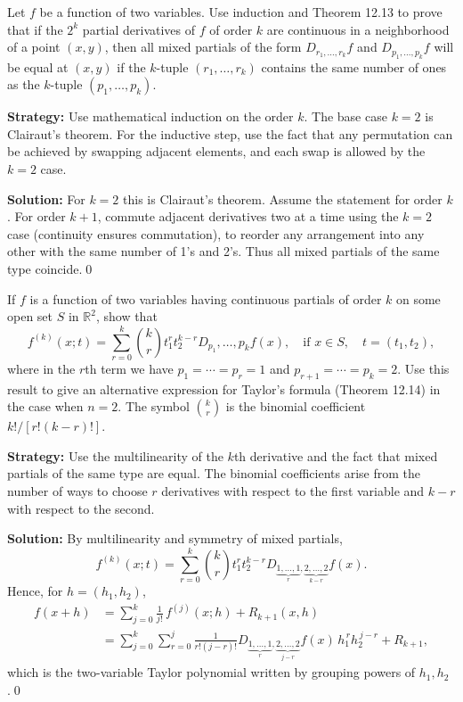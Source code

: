 \begin{problembox}
Let \( f \) be a function of two variables. Use induction and Theorem 12.13 to prove that if the \( 2^k \) partial derivatives of \( f \) of order \( k \) are continuous in a neighborhood of a point \( (x, y) \), then all mixed partials of the form \( D_{r_1, \ldots, r_k} f \) and \( D_{p_1, \ldots, p_k} f \) will be equal at \( (x, y) \) if the \( k \)-tuple \( (r_1, \ldots, r_k) \) contains the same number of ones as the \( k \)-tuple \( (p_1, \ldots, p_k) \).
\end{problembox}

\noindent\textbf{Strategy:} Use mathematical induction on the order \( k \). The base case \( k = 2 \) is Clairaut's theorem. For the inductive step, use the fact that any permutation can be achieved by swapping adjacent elements, and each swap is allowed by the \( k = 2 \) case.

\bigskip\noindent\textbf{Solution:}
For $k=2$ this is Clairaut's theorem. Assume the statement for order $k$. For order $k+1$, commute adjacent derivatives two at a time using the $k=2$ case (continuity ensures commutation), to reorder any arrangement into any other with the same number of 1's and 2's. Thus all mixed partials of the same type coincide.\qed


\begin{problembox}
If \( f \) is a function of two variables having continuous partials of order \( k \) on some open set \( S \) in \( \mathbb{R}^2 \), show that
\[f^{(k)} (x; t) = \sum_{r=0}^{k} \binom{k}{r} t_1^r t_2^{k-r} D_{p_1}, \ldots, p_k f(x), \quad \text{if } x \in S, \quad t = (t_1, t_2),\]
where in the \( r \)th term we have \( p_1 = \cdots = p_r = 1 \) and \( p_{r+1} = \cdots = p_k = 2 \). Use this result to give an alternative expression for Taylor's formula (Theorem 12.14) in the case when \( n = 2 \). The symbol \( \binom{k}{r} \) is the binomial coefficient \( k! / [r! (k - r)!] \).
\end{problembox}

\noindent\textbf{Strategy:} Use the multilinearity of the \( k \)th derivative and the fact that mixed partials of the same type are equal. The binomial coefficients arise from the number of ways to choose \( r \) derivatives with respect to the first variable and \( k-r \) with respect to the second.

\bigskip\noindent\textbf{Solution:}
By multilinearity and symmetry of mixed partials,
\[f^{(k)}(x;t)=\sum_{r=0}^k \binom{k}{r} t_1^r t_2^{k-r} D_{\underbrace{1,\dots,1}_{r},\underbrace{2,\dots,2}_{k-r}} f(x).\]
Hence, for $h=(h_1,h_2)$,
\begin{align*}
f(x+h)&=\sum_{j=0}^k \frac{1}{j!}\,f^{(j)}(x;h)+R_{k+1}(x,h)\\
&=\sum_{j=0}^k\sum_{r=0}^j \frac{1}{r!(j-r)!} D_{\!\underbrace{1,\dots,1}_{r},\underbrace{2,\dots,2}_{j-r}} f(x)\,h_1^{\,r} h_2^{\,j-r}+R_{k+1},
\end{align*}
which is the two-variable Taylor polynomial written by grouping powers of $h_1,h_2$.\qed


